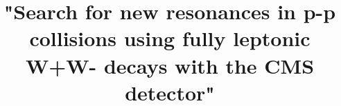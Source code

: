 \documentclass[PhD,binding=0.6cm]{../sapthesis}
\title{"Search for new resonances in p-p collisions using fully leptonic W+W- decays with the CMS detector" }
\begin{document}
\newcommand{\aMC}{\textsc{MadGraph}\xspace}
\newcommand{\qqbar}{$q \bar{q}$}
\newcommand{\POWHEG} {{\textsc{powheg}}\xspace}

\frontmatter

\maketitle

\dedication{ dedica a ...}


\begin{abstract}



\end{abstract}
\end{document}
